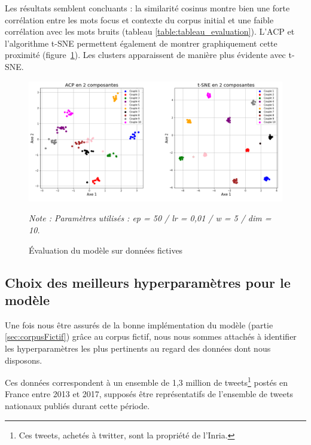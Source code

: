 \documentclass[11pt,french,french]{article}
\let\rmarkdownfootnote\footnote%
\def\footnote{\protect\rmarkdownfootnote}
\begin{document}
Les résultats semblent concluants : la similarité cosinus montre bien une forte corrélation entre les mots focus et contexte du corpus initial et une faible corrélation avec les mots bruits (tableau \ref{table:tableau_evaluation}).
L'ACP et l'algorithme t-SNE permettent également de montrer graphiquement cette proximité (figure~\ref{fig:figure_evaluation}).
Les clusters apparaissent de manière plus évidente avec t-SNE.

\begin{figure}
\begin{center}
\includegraphics[width=1\textwidth]{img/figures.png}
\captionsetup{margin=0cm,format=hang,justification=justified}
\caption{Évaluation du modèle sur données fictives}\label{fig:figure_evaluation}
\end{center}
\vspace{-0.3cm}
\footnotesize
\emph{Note : Paramètres utilisés : ep = 50 / lr = 0,01 / w = 5 / dim = 10.}
\end{figure}

\hypertarget{sec:hyperparametres}{%
\subsection{Choix des meilleurs hyperparamètres pour le modèle}\label{sec:hyperparametres}}

Une fois nous être assurés de la bonne implémentation du modèle (partie \ref{sec:corpusFictif}) grâce au corpus fictif, nous nous sommes attachés à identifier les hyperparamètres les plus pertinents au regard des données dont nous disposons.

Ces données correspondent à un ensemble de 1,3 million de tweets\footnote{Ces tweets, achetés à twitter, sont la propriété de l'Inria.}
postés en France entre 2013 et 2017, supposés être représentatifs de l'ensemble de tweets nationaux publiés durant cette période.
\end{document}
